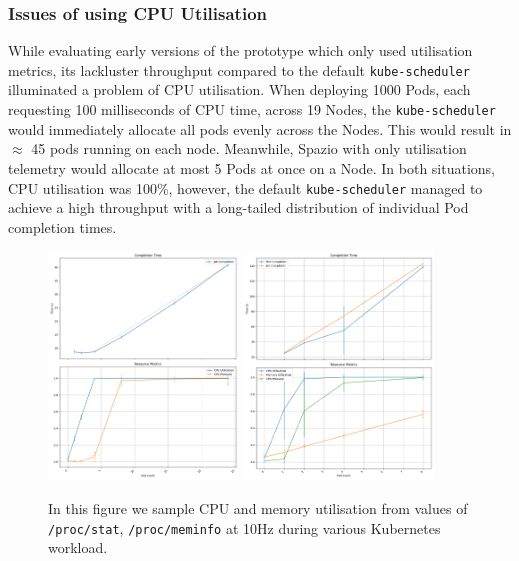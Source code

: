 \subsubsection{Issues of using CPU Utilisation}
While evaluating early versions of the prototype which only used utilisation
metrics, its lackluster throughput compared to the default \verb|kube-scheduler|
illuminated a problem of CPU utilisation. When deploying 1000 Pods, each
requesting 100 milliseconds of CPU time, across 19 Nodes, the
\verb|kube-scheduler| would immediately allocate all pods evenly across the
Nodes. This would result in $\approx$ 45 pods running on each node. Meanwhile,
Spazio with only utilisation telemetry would allocate at most 5 Pods at once on
a Node. In both situations, CPU utilisation was 100\%, however, the default
\verb|kube-scheduler| managed to achieve a high throughput with a long-tailed
distribution of individual Pod completion times.

\begin{figure}[H]
    \centering
    \includegraphics[width=0.45\textwidth]{images/podcount-util-pressure.png}
    \includegraphics[width=0.45\textwidth]{images/ml-podcount-util-pressure.png}
    \caption{In this figure we sample CPU and memory utilisation from
    values of \texttt{/proc/stat}, \texttt{/proc/meminfo} at 10Hz during various Kubernetes workload.}
    \label{fig:podcount-util-pressure}
\end{figure}

